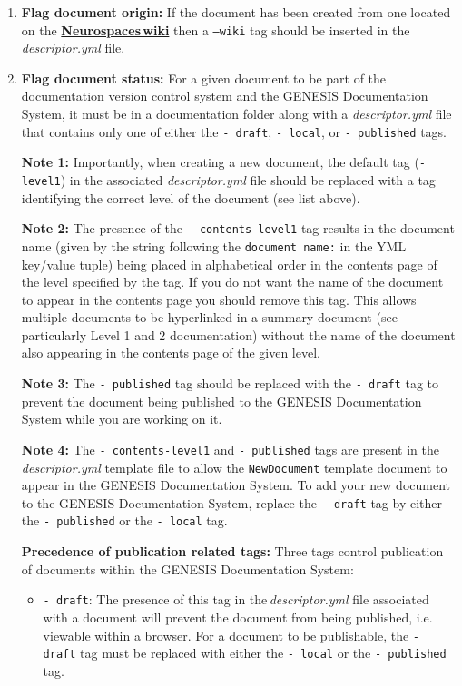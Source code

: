 \documentclass[12pt]{article}
\begin{document}
\begin{enumerate}
\begin{enumerate}
\item {\bf Flag document origin:} If the document has been created from one located on the \href{http://code.google.com/p/neurospaces/w/list}{\bf Neurospaces\,wiki} then a {\tt --wiki} tag should be inserted in the {\it descriptor.yml} file.

\item {\bf Flag document status:} For a given document to be part of the documentation version control system and the GENESIS Documentation System, it must be in a documentation folder along with a {\it descriptor.yml} file that contains only one of either the {\tt -\,draft}, {\tt -\,local}, or {\tt -\,published} tags.

{\bf Note 1:} Importantly, when creating a new document, the default tag ({\tt -\,level1}) in the associated {\it descriptor.yml} file should be replaced with a tag identifying the correct level of the document (see list above).

{\bf Note 2:} The presence of the {\tt -\,contents-level1} tag results in the document name (given by the string following the {\tt document name:} in the YML key/value tuple) being placed in alphabetical order in the contents page of the level specified by the tag. If you do not want the name of the document to appear in the contents page you should remove this tag. This allows multiple documents to be hyperlinked in a summary document (see particularly Level 1 and 2 documentation) without the name of the document also appearing in the contents page of the given level.

{\bf Note 3:} The {\tt-\,published} tag should be replaced with the {\tt -\,draft} tag to prevent the document being published to the GENESIS Documentation System while you are working on it. 

{\bf Note 4:} The {\tt -\,contents-level1} and {\tt-\,published} tags are present in the {\it descriptor.yml} template file to allow the {\tt NewDocument} template document to appear in the GENESIS Documentation System. To add your new document to the GENESIS Documentation System, replace the {\tt -\,draft} tag by either the {\tt -\,published} or the {\tt -\,local} tag.  

{\bf Precedence of publication related tags:} Three tags control publication of documents within the GENESIS Documentation System:
\begin{itemize}
	\item[]{\tt -\,draft}: The presence of this tag in the\,{\it descriptor.yml} file associated with a document will prevent the document 
	from being published,  i.e. viewable within a browser. For a document to be publishable, the {\tt -\,draft} tag must be replaced 
	with either the {\tt -\,local} or the {\tt -\,published} tag.
	

\end{itemize}
\end{enumerate}
\end{enumerate}
\end{document}
